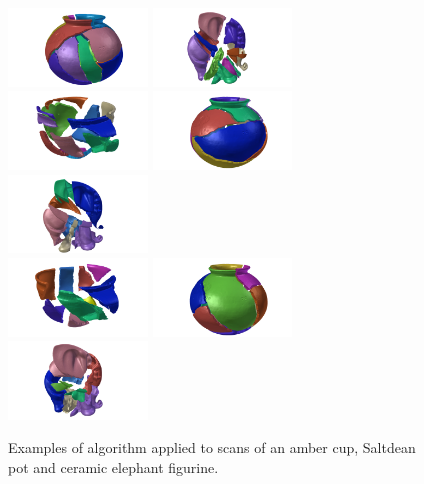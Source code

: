 \documentclass[acmlarge,screen,dvipsnames]{acmart}
\begin{document}
\begin{figure}[H]
  \includegraphics[width=0.33\textwidth]{images/saltdeanpuzzle2}%
  \includegraphics[width=0.33\textwidth]{images/elephantpuzzle2}\\
  \includegraphics[width=0.33\textwidth]{images/ambercuppuzzle5}%
  \includegraphics[width=0.33\textwidth]{images/saltdeanpuzzle3}%
  \includegraphics[width=0.33\textwidth]{images/elephantpuzzle3}\\
  \includegraphics[width=0.33\textwidth]{images/ambercuppuzzle6}%
  \includegraphics[width=0.33\textwidth]{images/saltdeanpuzzle4}%
  \includegraphics[width=0.33\textwidth]{images/elephantpuzzle4}
  \caption{\label{fig:three-shapes-with-different-fractures}%
    Examples of algorithm applied to scans of an amber cup, Saltdean pot and
    ceramic elephant figurine.}
\end{figure}
\end{document}

